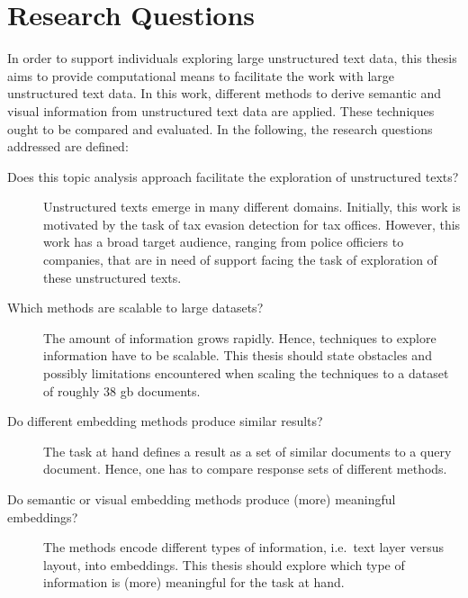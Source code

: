 \section{Research Questions}\label{sec:research-questions}

In order to support individuals exploring large unstructured text data, 
this thesis aims to provide computational means to facilitate the work with large unstructured text data.
In this work, different methods to derive semantic and visual information from unstructured text data are applied.
These techniques ought to be compared and evaluated.
In the following, the research questions addressed are defined:
\begin{description}
    \item[Does this topic analysis approach facilitate the exploration of unstructured texts?]
    Unstructured texts emerge in many different domains.
    Initially, this work is motivated by the task of tax evasion detection for tax offices.
    However, this work has a broad target audience, ranging from police officiers to companies, 
    that are in need of support facing the task of exploration of these unstructured texts.

    \item[Which methods are scalable to large datasets?]
    The amount of information grows rapidly.
    Hence, techniques to explore information have to be scalable.
    This thesis should state obstacles and possibly limitations encountered when scaling the techniques to a dataset of roughly 38 \ac{gb} documents.

    \item[Do different embedding methods produce similar results?]
    The task at hand defines a result as a set of similar documents to a query document.
    Hence, one has to compare response sets of different methods.

    \item[Do semantic or visual embedding methods produce (more) meaningful embeddings?]
    The methods encode different types of information, i.e.\ text layer versus layout, into embeddings. 
    This thesis should explore which type of information is (more) meaningful for the task at hand.


\end{description}

